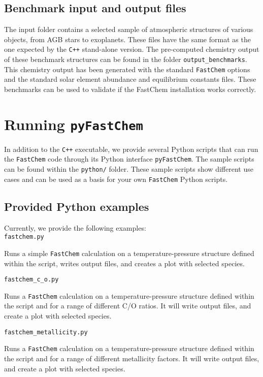 \documentclass[numbers=noenddot]{aux/fcmanual}
\newcommand{\fc}{\texttt{FastChem}\xspace}
\newcommand{\pfc}{\texttt{pyFastChem}\xspace}
\newcommand{\cpp}{\ttt{C++}\xspace}
\newcommand{\ttt}[1]{\texttt {#1}}
\begin{document}
\section{Benchmark input and output files}

The input folder contains a selected sample of atmospheric structures of various objects, from AGB stars to exoplanets. These files have the same format as the one expected by the \cpp stand-alone version. The pre-computed chemistry output of these benchmark structures can be found in the folder \texttt{output\_benchmarks}. This chemistry output has been generated with the standard \fc options and the standard solar element abundance and equilibrium constants files. These benchmarks can be used to validate if the FastChem installation works correctly.


\chapter{Running \pfc}

In addition to the \cpp executable, we provide several Python scripts that can run the \fc code through its Python interface \pfc. The sample scripts can be found within the \verb|python/| folder. These sample scripts show different use cases and can be used as a basis for your own \fc Python scripts.

\section{Provided Python examples}
\label{sec:pyfc_examples}
Currently, we provide the following examples:\\

\lstinline!fastchem.py!
\begin{addmargin}[25pt]{0pt}
  Runs a simple \fc calculation on a temperature-pressure structure defined within the script, writes output files, and creates a plot with selected species.\\
\end{addmargin}

\lstinline!fastchem_c_o.py!
\begin{addmargin}[25pt]{0pt}
  Runs a \fc calculation on a temperature-pressure structure defined within the script and for a range of different C/O ratios. It will write output files, and create a plot with selected species.\\
\end{addmargin}

\lstinline!fastchem_metallicity.py!
\begin{addmargin}[25pt]{0pt}
  Runs a \fc calculation on a temperature-pressure structure defined within the script and for a range of different metallicity factors. It will write output files, and create a plot with selected species.\\
\end{addmargin}
\end{document}
